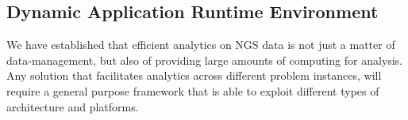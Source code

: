 \documentclass{cpeauth}
\begin{document}

% 


\subsection{Dynamic Application Runtime Environment}

We have established that efficient analytics on NGS data is not just a
matter of data-management, but also of providing large amounts of
computing for analysis. Any solution that facilitates analytics across
different problem instances, will require a general purpose framework
that is able to exploit different types of architecture and platforms.


 
\end{document}
